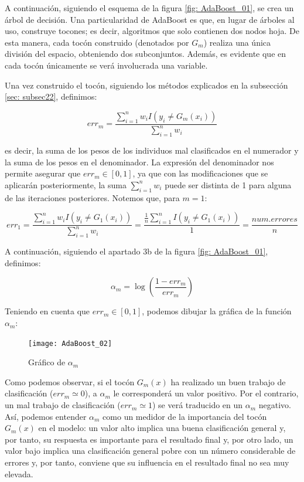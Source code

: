 \documentclass[12pt,twoside]{article}
\begin{document}
A continuación, siguiendo el esquema de la figura \ref{fig: AdaBoost_01}, se crea un árbol de decisión. Una particularidad de AdaBoost es que, en lugar de árboles al uso, construye tocones; es decir, algoritmos que solo contienen dos nodos hoja. De esta manera, cada tocón construido (denotados por $G_m$) realiza una única división del espacio, obteniendo dos subconjuntos. Además, es evidente que en cada tocón únicamente se verá involucrada una variable.

Una vez construido el tocón, siguiendo los métodos explicados en la subsección \ref{sec: subsec22}, definimos:

\begin{equation*}
err_m = \frac{\sum_{i=1}^{n} w_i I(y_i \neq G_m(x_i))}{\sum_{i=1}^{n} w_i} 
\end{equation*}

\noindent
es decir, la suma de los pesos de los individuos mal clasificados en el numerador y la suma de los pesos en el denominador. La expresión del denominador nos permite asegurar que $err_m \in [0, 1]$, ya que con las modificaciones que se aplicarán posteriormente, la suma $\sum_{i = 1}^n w_i$ puede ser distinta de 1 para alguna de las iteraciones posteriores. Notemos que, para $m = 1$:

\begin{equation*}
err_1 = \frac{\sum_{i=1}^{n} w_i I(y_i \neq G_1(x_i))}{\sum_{i=1}^{n} w_i} = \frac{\frac{1}{n} \sum_{i=1}^{n}I(y_i \neq G_1(x_i))}{1} = \frac{num.errores}{n}
\end{equation*}

A continuación, siguiendo el apartado 3b de la figura \ref{fig: AdaBoost_01}, definimos:

\begin{equation*}
\alpha _m = \log \left( \frac{1 - err_m}{err_m} \right)
\end{equation*}

Teniendo en cuenta que $err_m \in [0, 1]$, podemos dibujar la gráfica de la función $\alpha_m$:

\begin{figure}[h]
\centering
\texttt{[image: AdaBoost\_02]}
\caption{Gráfico de $\alpha_m$}
\label{fig: AdaBoost_02}
\end{figure}

Como podemos observar, si el tocón $G_m(x)$ ha realizado un buen trabajo de clasificación ($err_m \simeq 0$), a $\alpha_m$ le corresponderá un valor positivo. Por el contrario, un mal trabajo de clasificación ($err_m \simeq 1$) se verá traducido en un $\alpha_m$ negativo. Así, podemos entender $\alpha_m$ como un medidor de la importancia del tocón $G_m(x)$ en el modelo: un valor alto implica una buena clasificación general y, por tanto, su respuesta es importante para el resultado final y, por otro lado, un valor bajo implica una clasificación general pobre con un número considerable de errores y, por tanto, conviene que su influencia en el resultado final no sea muy elevada.
\end{document}
